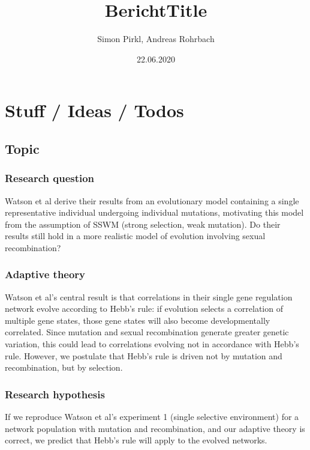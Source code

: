 \documentclass{article}
\title{BerichtTitle}
\date{22.06.2020}
\author{Simon Pirkl, Andreas Rohrbach}
\begin{document}
\maketitle

\tableofcontents
\newpage

\section{Stuff / Ideas / Todos}

\subsection{Topic}
\subsubsection{Research question}
Watson et al derive their results from an evolutionary model containing a single representative individual undergoing individual mutations, motivating this model from the assumption of SSWM (strong selection, weak mutation). Do their results still hold in a more realistic model of evolution involving sexual recombination?

\subsubsection{Adaptive theory}
Watson et al’s central result is that correlations in their single gene regulation network evolve according to Hebb’s rule: if evolution selects a correlation of multiple gene states, those gene states will also become developmentally correlated. Since mutation and sexual recombination generate greater genetic variation, this could lead to correlations evolving not in accordance with Hebb's rule. However, we postulate that Hebb’s rule is driven not by mutation and recombination, but by selection.

\subsubsection{Research hypothesis}
If we reproduce Watson et al’s experiment 1 (single selective environment) for a network population with mutation and recombination, and our adaptive theory is correct, we predict that Hebb’s rule will apply to the evolved networks.

\end{document}
